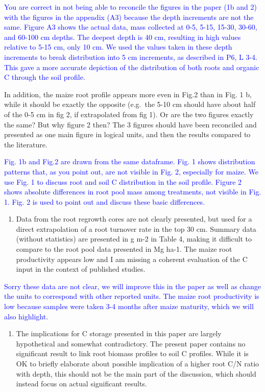 \documentclass[]{article}
\providecommand{\tightlist}{%
  \setlength{\itemsep}{0pt}\setlength{\parskip}{0pt}}
\begin{document}
\textcolor{blue}{You are correct in not being able to reconcile the figures in the paper (1b and 2) with the figures in the appendix (A3) because the depth increments are not the same. Figure A3 shows the actual data, mass collected at 0-5, 5-15, 15-30, 30-60, and 60-100 cm depths. The deepest depth is 40 cm, resulting in high values relative to 5-15 cm, only 10 cm. We used the values taken in these depth increments to break distribution into 5 cm increments, as described in P6, L 3-4. This gave a more accurate depiction of the distribution of both roots and organic C through the soil profile.}

In addition, the maize root profile appears more even in Fig.2 than in
Fig. 1 b, while it should be exactly the opposite (e.g.~the 5-10 cm
should have about half of the 0-5 cm in fig 2, if extrapolated from fig
1). Or are the two figures exactly the same? But why figure 2 then? The
3 figures should have been reconciled and presented as one main figure
in logical units, and then the results compared to the literature.

\textcolor{blue}{Fig. 1b and Fig.2 are drawn from the same dataframe. Fig. 1 shows distribution patterns that, as you point out, are not visible in Fig. 2, especially for maize. We use Fig. 1 to discuss root and soil C distribution in the soil profile. Figure 2 shows absolute differences in root pool mass among treatments, not visible in Fig. 1. Fig. 2 is used to point out and discuss these basic differences.}

\begin{enumerate}
\def\labelenumi{\arabic{enumi})}
\setcounter{enumi}{2}
\tightlist
\item
  Data from the root regrowth cores are not clearly presented, but used
  for a direct extrapolation of a root turnover rate in the top 30 cm.
  Summary data (without statistics) are presented in g m-2 in Table 4,
  making it difficult to compare to the root pool data presented in Mg
  ha-1. The maize root productivity appears low and I am missing a
  coherent evaluation of the C input in the context of published
  studies.
\end{enumerate}

\textcolor{blue}{Sorry these data are not clear, we will improve this in the paper as well as change the units to correspond with other reported units. The maize root productivity is low because samples were taken 3-4 months after maize maturity, which we will also highlight.}

\begin{enumerate}
\def\labelenumi{\arabic{enumi})}
\setcounter{enumi}{3}
\tightlist
\item
  The implications for C storage presented in this paper are largely
  hypothetical and somewhat contradictory. The present paper contains no
  significant result to link root biomass profiles to soil C profiles.
  While it is OK to briefly elaborate about possible implication of a
  higher root C/N ratio with depth, this should not be the main part of
  the discussion, which should instead focus on actual significant
  results.
\end{enumerate}
\end{document}

